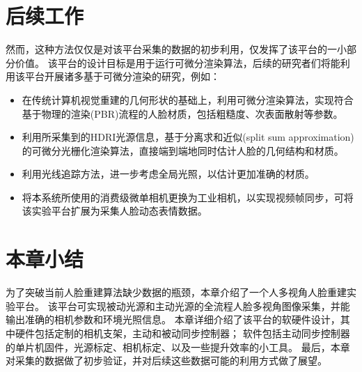 

\section{后续工作}

然而，这种方法仅仅是对该平台采集的数据的初步利用，仅发挥了该平台的一小部分价值。
该平台的设计目标是用于运行可微分渲染算法，后续的研究者们将能利用该平台开展诸多基于可微分渲染的研究，例如：
\begin{itemize}
\item 在传统计算机视觉重建的几何形状的基础上，利用可微分渲染算法，实现符合基于物理的渲染(PBR)流程的人脸材质，包括粗糙度、次表面散射等参数。
\item 利用所采集到的HDRI光源信息，基于分离求和近似(split sum approximation)的可微分光栅化渲染算法，直接端到端地同时估计人脸的几何结构和材质。
\item 利用光线追踪方法，进一步考虑全局光照，以估计更加准确的材质。
\item 将本系统所使用的消费级微单相机更换为工业相机，以实现视频帧同步，可将该实验平台扩展为采集人脸动态表情数据。
\end{itemize}

\section*{本章小结}

为了突破当前人脸重建算法缺少数据的瓶颈，本章介绍了一个人多视角人脸重建实验平台。
该平台可实现被动光源和主动光源的全流程人脸多视角图像采集，并能输出准确的相机参数和环境光照信息。
本章详细介绍了该平台的软硬件设计，其中硬件包括定制的相机支架，主动和被动同步控制器；
软件包括主动同步控制器的单片机固件，光源标定、相机标定、以及一些提升效率的小工具。
最后，本章对采集的数据做了初步验证，并对后续这些数据可能的利用方式做了展望。
